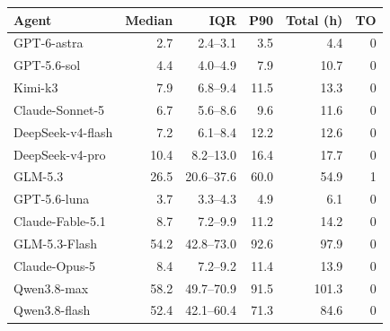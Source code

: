 \begin{tabular}{@{}lrrrrr@{}}
\toprule
Agent & Median & IQR & P90 & Total (h) & TO \\
\midrule
GPT-6-astra & 2.7 & 2.4--3.1 & 3.5 & 4.4 & 0 \\
GPT-5.6-sol & 4.4 & 4.0--4.9 & 7.9 & 10.7 & 0 \\
Kimi-k3 & 7.9 & 6.8--9.4 & 11.5 & 13.3 & 0 \\
Claude-Sonnet-5 & 6.7 & 5.6--8.6 & 9.6 & 11.6 & 0 \\
DeepSeek-v4-flash & 7.2 & 6.1--8.4 & 12.2 & 12.6 & 0 \\
DeepSeek-v4-pro & 10.4 & 8.2--13.0 & 16.4 & 17.7 & 0 \\
GLM-5.3 & 26.5 & 20.6--37.6 & 60.0 & 54.9 & 1 \\
GPT-5.6-luna & 3.7 & 3.3--4.3 & 4.9 & 6.1 & 0 \\
Claude-Fable-5.1 & 8.7 & 7.2--9.9 & 11.2 & 14.2 & 0 \\
GLM-5.3-Flash & 54.2 & 42.8--73.0 & 92.6 & 97.9 & 0 \\
Claude-Opus-5 & 8.4 & 7.2--9.2 & 11.4 & 13.9 & 0 \\
Qwen3.8-max & 58.2 & 49.7--70.9 & 91.5 & 101.3 & 0 \\
Qwen3.8-flash & 52.4 & 42.1--60.4 & 71.3 & 84.6 & 0 \\
\bottomrule
\end{tabular}
